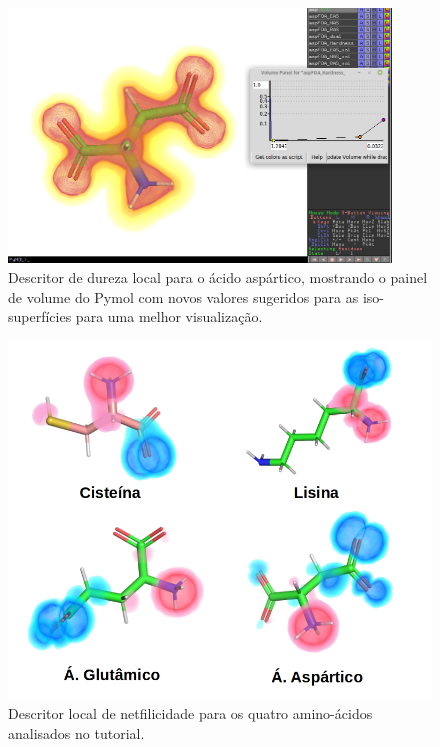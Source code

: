 \documentclass[a4paper,11pt]{refart}
\begin{document}
\hspace*{-\leftmarginwidth}
\begin{minipage}{\fullwidth}
	\begin{figure}[H]
		\begin{center}
			\includegraphics[width=4in]{images/tut4_img14}
			\caption{Descritor de dureza local para o ácido aspártico, mostrando o painel de volume do Pymol com novos valores sugeridos para as iso-superfícies para uma melhor visualização.}
			\label{fig_tut4_12}
		\end{center}
	\end{figure}
\end{minipage}

\hspace*{-\leftmarginwidth}
\begin{minipage}{\fullwidth}
	\begin{figure}[H]
		\begin{center}
			\includegraphics[width=5in]{images/tut4_img15}
			\caption{Descritor local de netfilicidade para os quatro amino-ácidos analisados no tutorial.}
			\label{fig_tut4_13}
		\end{center}
	\end{figure}
\end{minipage}
\end{document}
